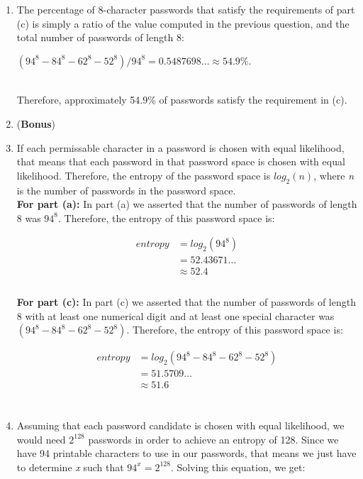 \documentclass[11pt]{article}
\theoremstyle{definition}
\begin{document}
\begin{enumerate}
\begin{enumerate}
\item The percentage of 8-character passwords that satisfy the requirements of part (c) is simply a ratio of the value computed in the previous question, and the total number of passwords
of length 8:\\
\centerline{$(94^8 - 84^8 - 62^8 - 52^8)/94^8 = 0.5487698\ldots \approx 54.9\%.$}\\

Therefore, approximately 54.9\% of passwords satisfy the requirement in (c).\\

\item (\textbf{Bonus})\\

\item If each permissable character in a password is chosen with equal likelihood, that means that each password in that password space is chosen with equal likelihood. Therefore,
the entropy of the password space is $log_2(n)$, where \textit{n} is the number of passwords in the password space.\\

\textbf{For part (a):} In part (a) we asserted that the number of passwords of length 8 was $94^8$. Therefore, the entropy of this password space is:

\begin{align*}
entropy &= log_2(94^8)\\
&= 52.43671\ldots \\
&\approx 52.4\\
\end{align*}\\

\textbf{For part (c):} In part (c) we asserted that the number of passwords of length 8 with at least one numerical digit and at least one special character was $(94^8 - 84^8 - 62^8 - 52^8)$.
Therefore, the entropy of this password space is:

\begin{align*}
entropy &= log_2(94^8 - 84^8 - 62^8 - 52^8)\\
&= 51.5709\ldots \\
&\approx 51.6\\
\end{align*}\\

\item Assuming that each password candidate is chosen with equal likelihood, we would need $2^128$ passwords in order to achieve an entropy of 128. Since we have 94 printable
characters to use in our passwords, that means we just have to determine \textit{x} such that $94^x = 2^{128}$. Solving this equation, we get:\\


\end{enumerate}
\end{enumerate}
\end{document}
